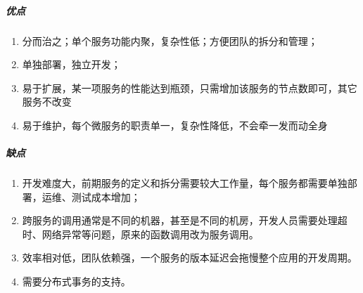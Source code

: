 \documentclass[letterpaper,11pt,english]{sphinxmanual}
\begin{document}
\subparagraph{优点}
\label{\detokenize{chapter_idea/understand_tech:id19}}\begin{enumerate}
%
\item {} 
分而治之；单个服务功能内聚，复杂性低；方便团队的拆分和管理；

\item {} 
单独部署，独立开发；

\item {} 
易于扩展，某一项服务的性能达到瓶颈，只需增加该服务的节点数即可，其它服务不改变

\item {} 
易于维护，每个微服务的职责单一，复杂性降低，不会牵一发而动全身

\end{enumerate}


\subparagraph{缺点}
\label{\detokenize{chapter_idea/understand_tech:id20}}\begin{enumerate}
%
\item {} 
开发难度大，前期服务的定义和拆分需要较大工作量，每个服务都需要单独部署，运维、测试成本增加；

\item {} 
跨服务的调用通常是不同的机器，甚至是不同的机房，开发人员需要处理超时、网络异常等问题，原来的函数调用改为服务调用。

\item {} 
效率相对低，团队依赖强，一个服务的版本延迟会拖慢整个应用的开发周期。

\item {} 
需要分布式事务的支持。

\end{enumerate}
\end{document}
